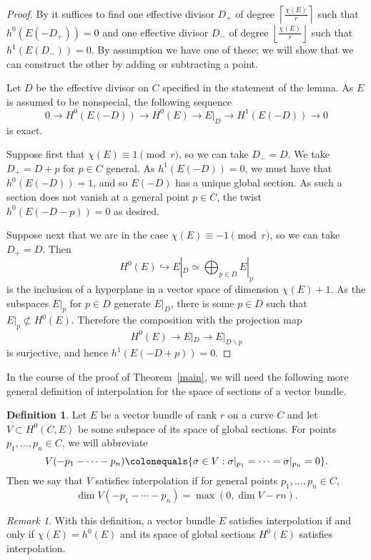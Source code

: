 \documentclass[11pt]{amsart}
\theoremstyle{definition}
\newtheorem{defin}[thm]{Definition}
\theoremstyle{remark}
\newtheorem{rem}{Remark}
\begin{document}
\begin{proof}
By \cite[Proposition 4.6]{joint} it suffices to find one effective divisor $D_+$ of degree $\left\lceil \frac{\chi(E)}{r} \right\rceil$ such that $h^0(E(-D_+))=0$ and one effective divisor $D_-$ of degree $\left\lfloor \frac{\chi(E)}{r} \right\rfloor$ such that $h^1(E(D_-)) = 0$.  By assumption we have one of these; we will show that we can construct the other by adding or subtracting a point.

Let $D$ be the effective divisor on $C$ specified in the statement of the lemma.  As $E$ is assumed to be nonspecial, the following sequence
\[0 \to H^0(E(-D)) \to H^0(E) \to E|_D \to H^1(E(-D)) \to 0 \]
is exact. 

Suppose first that $\chi(E) \equiv 1 \pmod{r}$, so we can take $D_- = D$. We take $D_+ = D + p$
for $p \in C$ general.
As $h^1(E(-D)) = 0$, we must have that $h^0(E(-D)) = 1$, and so $E(-D)$ has a unique global section.  As such a section does not vanish at a general point $p \in C$, the twist $h^0(E(-D-p)) = 0$ as desired.

Suppose next that we are in the case $\chi(E) \equiv -1 \pmod r$, so we can take $D_+ = D$.  Then 
\[H^0(E) \hookrightarrow E|_D \simeq \bigoplus_{p \in D} E|_p\]
is the inclusion of a hyperplane in a vector space of dimension $\chi(E) +1$.  As the subspaces $E|_p$ for $p \in D$ generate $E|_D$, there is some $p \in D$ such that $E|_p \not\subset H^0(E)$.  Therefore the composition with the projection map
\[H^0(E) \to E|_D \to E|_{D \smallsetminus p} \]
is surjective, and hence $h^1(E(-D+p)) = 0$.
\end{proof}

In the course of the proof of Theorem~\ref{main}, we will need the following more general definition of interpolation for the space of sections of a vector bundle.

\begin{defin}
Let $E$ be a vector bundle of rank $r$ on a curve $C$ and let $V \subset H^0(C, E)$ be some subspace of its space of global sections.  For points $p_1, \ldots, p_n \in C$, we will abbreviate 
\[ V(-p_1-\cdots -p_n) \colonequals \{ \sigma \in V : \sigma|_{p_1} = \cdots =  \sigma|_{p_n} = 0 \}.\]
Then we say that $V$ satisfies interpolation if for general points $p_1, \ldots, p_n \in C$, 
\[\dim V(-p_1-\cdots-p_n) = \max(0, \dim V - rn). \]
\end{defin}
\begin{rem}
With this definition, a vector bundle $E$ satisfies interpolation if and only if $\chi(E) = h^0(E)$ and its space of global sections $H^0(E)$ satisfies interpolation.
\end{rem}
\end{document}
